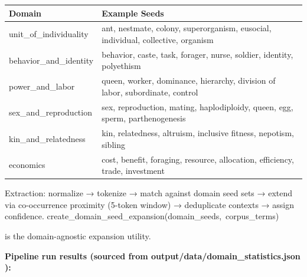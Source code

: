 \documentclass[
]{article}
\newcounter{none} %
\numberwithin{equation}{section}
\renewcommand{\texttt}[1]{%
    \colorbox{codebg}{\color{codefg}\ttfamily #1}%
}
\begin{document}
{\def\LTcaptype{none} %
\begin{longtable}[]{@{}
  >{\raggedright\arraybackslash}p{}
  >{\raggedright\arraybackslash}p{}@{}}
\toprule\noalign{}
\begin{minipage}[b]{\linewidth}\raggedright
Domain
\end{minipage} & \begin{minipage}[b]{\linewidth}\raggedright
Example Seeds
\end{minipage} \\
\midrule\noalign{}
\endhead
\bottomrule\noalign{}
\endlastfoot
\texttt{unit\_of\_individuality} & ant, nestmate, colony, superorganism,
eusocial, individual, collective, organism \\
\texttt{behavior\_and\_identity} & behavior, caste, task, forager,
nurse, soldier, identity, polyethism \\
\texttt{power\_and\_labor} & queen, worker, dominance, hierarchy,
division of labor, subordinate, control \\
\texttt{sex\_and\_reproduction} & sex, reproduction, mating,
haplodiploidy, queen, egg, sperm, parthenogenesis \\
\texttt{kin\_and\_relatedness} & kin, relatedness, altruism, inclusive
fitness, nepotism, sibling \\
\texttt{economics} & cost, benefit, foraging, resource, allocation,
efficiency, trade, investment \\
\end{longtable}
}

Extraction: normalize → tokenize → match against domain seed sets →
extend via co-occurrence proximity (5-token window) → deduplicate
contexts → assign confidence.
\texttt{create\_domain\_seed\_expansion(domain\_seeds,\ corpus\_terms)}
is the domain-agnostic expansion utility.

\textbf{Pipeline run results (sourced from
\texttt{output/data/domain\_statistics.json}):}
\end{document}

